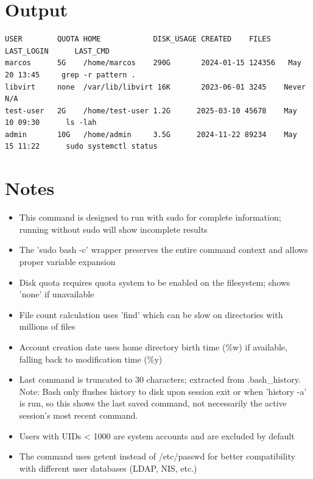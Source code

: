 \documentclass{article}
\begin{document}
\begin{enumerate}
\end{enumerate}

\section*{Output}
\begin{lstlisting}
USER        QUOTA HOME            DISK_USAGE CREATED    FILES LAST_LOGIN      LAST_CMD
marcos      5G    /home/marcos    290G       2024-01-15 124356   May  20 13:45     grep -r pattern .
libvirt     none  /var/lib/libvirt 16K       2023-06-01 3245    Never              N/A
test-user   2G    /home/test-user 1.2G      2025-03-10 45678    May  10 09:30      ls -lah
admin       10G   /home/admin     3.5G      2024-11-22 89234    May  15 11:22      sudo systemctl status
\end{lstlisting}

\section*{Notes}
\begin{itemize}
  \item This command is designed to run with sudo for complete information; running without sudo will show incomplete results
  \item The 'sudo bash -c' wrapper preserves the entire command context and allows proper variable expansion
  \item Disk quota requires quota system to be enabled on the filesystem; shows 'none' if unavailable
  \item File count calculation uses 'find' which can be slow on directories with millions of files
  \item Account creation date uses home directory birth time (\%w) if available, falling back to modification time (\%y)
  \item Last command is truncated to 30 characters; extracted from .bash\_history. Note: Bash only flushes history to disk upon session exit or when 'history -a' is run, so this shows the last saved command, not necessarily the active session's most recent command.
  \item Users with UIDs < 1000 are system accounts and are excluded by default
  \item The command uses getent instead of /etc/passwd for better compatibility with different user databases (LDAP, NIS, etc.)
\end{itemize}
\end{document}
